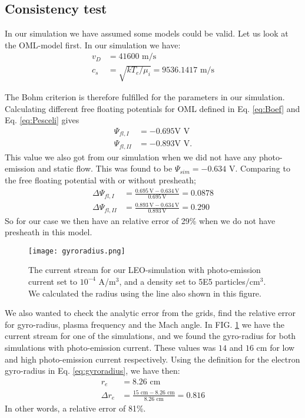 \documentclass[aip, 
rsi, 
amsmath,
amssymb,
longbibliography,
reprint]{revtex4-1}
\begin{document}
\subsection{Consistency test}

In our simulation we have assumed some models could be valid. Let us look at the OML-model first. In our simulation we have:
\begin{align*}
v_D &= 41600 \, \, \text{m/s}\\
c_s &= \sqrt{k T_e / \mu_i} = 9536.1417 \, \, \text{m/s}
\end{align*}

The Bohm criterion is therefore fulfilled for the parameters in our simulation. Calculating different free floating potentials for OML defined in Eq. \ref{eq:Boef} and Eq. \ref{eq:Pesceli} gives
\begin{align*}
\Psi_{fl,I} &= -0.695\text{V} \, \, \text{V}\\
\Psi_{fl,II}&= -0.893 \text{V}\, \, \text{V}.
\end{align*}
This value we also got from our simulation when we did not have any photo-emission and static flow. This was found to be $\Psi_{sim} = -0.634$ V. Comparing to the free floating potential with or without presheath;
\begin{align*}
\Delta \Psi_{fl,I} &= \frac{0.695 \, \text{V} -0.634 \, \text{V}}{0.695 \, \text{V}} = 0.0878\\
\Delta \Psi_{fl,II} &= \frac{0.893 \, \text{V} -0.634 \, \text{V}}{0.893 \, \text{V}} = 0.290
\end{align*}
So for our case we then have an relative error of 29\% when we do not have presheath in this model.\\

\begin{figure}
\texttt{[image: gyroradius.png]}
\caption{The current stream for our LEO-simulation with photo-emission current set to $10^{-4}$ A/m$^3$, and a density set to 5E5 particles/cm$^3$. We calculated the radius using the line also shown in this figure.\label{fig:gyroradius}}
\end{figure}

We also wanted to check the analytic error from the grids, find the relative error for gyro-radius, plasma frequency and the Mach angle. In FIG. \ref{fig:gyroradius} we have the current stream for one of the simulations, and we found the gyro-radius for both simulations with photo-emission current. These values was $14$ and $16$ cm for low and high photo-emission current respectively. Using the definition for the electron gyro-radius in Eq. \ref{eq:gyroradius}, we have then:
\begin{align*}
r_e &= 8.26 \, \, \text{cm}\\
\Delta r_e &= \frac{15 \, \, \text{cm}- 8.26 \, \, \text{cm}}{8.26 \, \, \text{cm}} = 0.816
\end{align*}
In other words, a relative error of 81\%.\\
\end{document}
